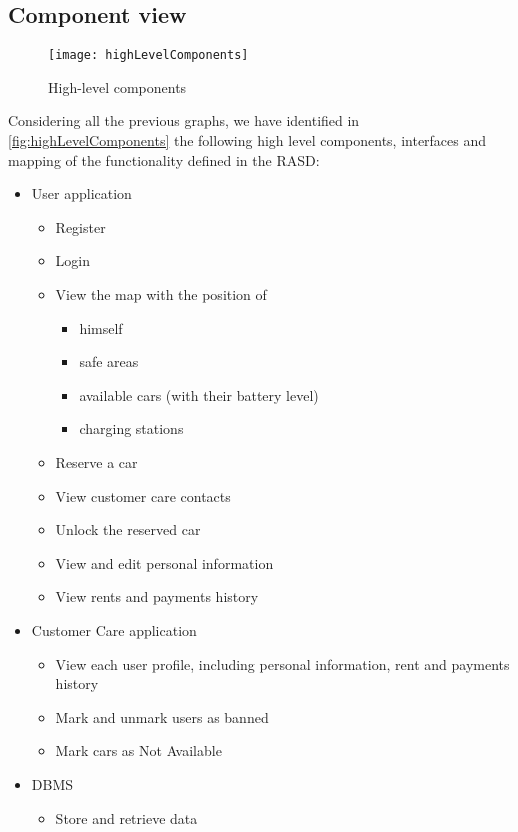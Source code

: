 \subsection{Component view}
\begin{figure}[h!]
	\centering
	\texttt{[image: highLevelComponents]}
	\caption{
		\label{fig:highLevelComponents} 
		High-level components
	}
\end{figure}
Considering all the previous graphs, we have identified in \autoref{fig:highLevelComponents} the following high level components, interfaces and mapping of the functionality defined in the RASD:
\begin{itemize}

	\item User application
	\begin{itemize}
		\item Register
		\item Login
		\item View the map with the position of
		\begin{itemize}
			\item himself
			\item safe areas
			\item available cars (with their battery level)
			\item charging stations
		\end{itemize}
		\item Reserve a car
		\item View customer care contacts
		\item Unlock the reserved car
		\item View and edit personal information
		\item View rents and payments history
	\end{itemize}
	
	\item Customer Care application
	\begin{itemize}
		\item View each user profile, including personal information, rent and payments history
		\item Mark and unmark users as banned
		\item Mark cars as Not Available
	\end{itemize}
	
	\item DBMS
	\begin{itemize}
		\item Store and retrieve data
	\end{itemize}	
	

\end{itemize}
